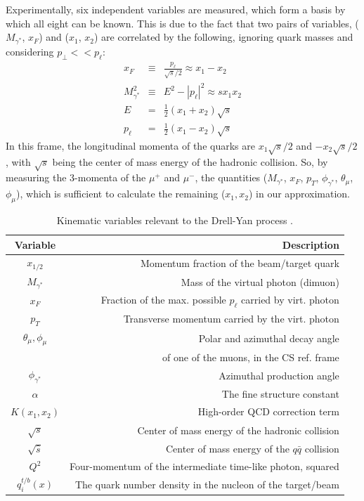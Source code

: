Experimentally, six independent variables are measured, which form a basis by which all eight can be known. This is due to the fact that two pairs of variables, ($M_{\gamma^*}$, $x_F$) and ($x_1$, $x_2$) are correlated by the following, ignoring quark masses and considering $p_\perp << p_{\ell}$:
\begin{eqnarray}
x_F & \equiv & \frac{p_{\ell}}{\sqrt{s}/2} \approx x_1 - x_2 \label{eq:xf=x1-x2} \\
M_{\gamma^*}^2 & \equiv & E^2 - |p_{\ell}|^2 \approx s x_1 x_2 \label{eq:m=sx1x2} \\
E & = & \frac{1}{2}(x_1 + x_2) \sqrt{s} \\
p_{\ell} & = & \frac{1}{2}(x_1 - x_2)\sqrt{s}
\end{eqnarray}
In this frame, the longitudinal momenta of the quarks are $x_1 \sqrt{s}/2$ and $- x_2 \sqrt{s}/2$, with $\sqrt{s}$ being the center of mass energy of the hadronic collision. So, by measuring the 3-momenta of the $\mu^+$ and $\mu^-$, the quantities ($M_{\gamma^*}$, $x_F$, $p_T$, $\phi_{\gamma^*}$, $\theta_\mu$, $\phi_\mu$), which is sufficient to calculate the remaining ($x_1, x_2$) in our approximation.

\begin{table}
	\centering
	\begin{tabular}{c|r}
		Variable&Description\\ \hline \hline
		$x_{1/2}$ & Momentum fraction of the beam/target quark\\
		$M_{\gamma^*}$ & Mass of the virtual photon (dimuon)\\
		$x_F$ & Fraction of the max. possible $p_{\ell}$ carried by virt. photon\\
		$p_T$ & Transverse momentum carried by the virt. photon\\
		$\theta_{\mu}, \phi_{\mu}$ & Polar and azimuthal decay angle\\ & of one of the muons, in the CS ref. frame\\ 
		$\phi_{\gamma^*}$ & Azimuthal production angle \\ \hline
		$\alpha$ & The fine structure constant \\
		$K(x_1,x_2)$ & High-order QCD correction term \\
		$\sqrt{s}$ & Center of mass energy of the hadronic collision \\
		$\sqrt{\hat{s}}$ & Center of mass energy of the $q\bar{q}$ collision \\
		$Q^{2}$ & Four-momentum of the intermediate time-like photon, squared \\ 
		$q_i^{t/b}(x)$ & The quark number density in the nucleon of the target/beam \\ \hline \hline
	\end{tabular}
	\caption{Kinematic variables relevant to the Drell-Yan process .}
	\label{tab:var}
\end{table}

